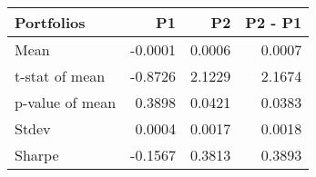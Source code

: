 \begin{tabular}{lrrr}
\toprule
Portfolios & P1 & P2 & P2 - P1 \\
\midrule
Mean & -0.0001 & 0.0006 & 0.0007 \\
t-stat of mean & -0.8726 & 2.1229 & 2.1674 \\
p-value of mean & 0.3898 & 0.0421 & 0.0383 \\
Stdev & 0.0004 & 0.0017 & 0.0018 \\
Sharpe & -0.1567 & 0.3813 & 0.3893 \\
\bottomrule
\end{tabular}

